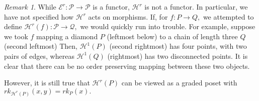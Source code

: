 \documentclass[10 pt]{amsart}
\theoremstyle{plain}
\theoremstyle{definition}
\theoremstyle{remark}
\newtheorem{rem}[thm]{Remark}
\numberwithin{equation}{section}
\begin{document}



\begin{rem}
While $\mathcal E^r:\mathcal P \rightarrow \mathcal P$ is a functor, $\mathcal H^r$ is not a functor. In particular, we have not specified how $\mathcal H^r$ acts on morphisms. If, for $f:P \rightarrow Q,$ we attempted to define $\mathcal H^r(f):\mathcal P \rightarrow \mathcal Q,$ we would quickly run into trouble. For example, suppose we took $f$ mapping a diamond $P$ (leftmost below) to a chain of length three $Q$ (second leftmost) Then, $\mathcal H^1(P)$ (second rightmost) has four points, with two pairs of edges, whereas $\mathcal H^1(Q)$ (rightmost) has two disconnected points. It is clear that there can be no order preserving mapping between these two objects. 

\begin{figure}
\end{figure}
However, it is still true that $\mathcal H^r(P)$ can be viewed as a graded poset with $rk_{\mathcal H^r(P)}(x, y) = rk_P(x).$
\end{rem}
\end{document}
